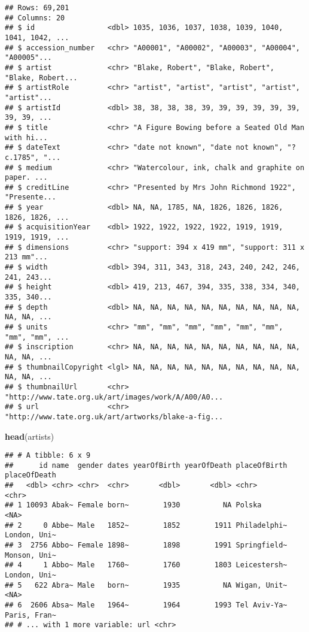 \documentclass[]{article}
\newenvironment{Shaded}{\begin{snugshade}}{\end{snugshade}}
\newcommand{\KeywordTok}[1]{\textcolor[rgb]{0.13,0.29,0.53}{\textbf{#1}}}
\newcommand{\NormalTok}[1]{#1}
\begin{document}
\begin{verbatim}
## Rows: 69,201
## Columns: 20
## $ id                 <dbl> 1035, 1036, 1037, 1038, 1039, 1040, 1041, 1042, ...
## $ accession_number   <chr> "A00001", "A00002", "A00003", "A00004", "A00005"...
## $ artist             <chr> "Blake, Robert", "Blake, Robert", "Blake, Robert...
## $ artistRole         <chr> "artist", "artist", "artist", "artist", "artist"...
## $ artistId           <dbl> 38, 38, 38, 38, 39, 39, 39, 39, 39, 39, 39, 39, ...
## $ title              <chr> "A Figure Bowing before a Seated Old Man with hi...
## $ dateText           <chr> "date not known", "date not known", "?c.1785", "...
## $ medium             <chr> "Watercolour, ink, chalk and graphite on paper. ...
## $ creditLine         <chr> "Presented by Mrs John Richmond 1922", "Presente...
## $ year               <dbl> NA, NA, 1785, NA, 1826, 1826, 1826, 1826, 1826, ...
## $ acquisitionYear    <dbl> 1922, 1922, 1922, 1922, 1919, 1919, 1919, 1919, ...
## $ dimensions         <chr> "support: 394 x 419 mm", "support: 311 x 213 mm"...
## $ width              <dbl> 394, 311, 343, 318, 243, 240, 242, 246, 241, 243...
## $ height             <dbl> 419, 213, 467, 394, 335, 338, 334, 340, 335, 340...
## $ depth              <dbl> NA, NA, NA, NA, NA, NA, NA, NA, NA, NA, NA, NA, ...
## $ units              <chr> "mm", "mm", "mm", "mm", "mm", "mm", "mm", "mm", ...
## $ inscription        <chr> NA, NA, NA, NA, NA, NA, NA, NA, NA, NA, NA, NA, ...
## $ thumbnailCopyright <lgl> NA, NA, NA, NA, NA, NA, NA, NA, NA, NA, NA, NA, ...
## $ thumbnailUrl       <chr> "http://www.tate.org.uk/art/images/work/A/A00/A0...
## $ url                <chr> "http://www.tate.org.uk/art/artworks/blake-a-fig...
\end{verbatim}

\begin{Shaded}
\begin{Highlighting}[]
\KeywordTok{head}\NormalTok{(artists)}
\end{Highlighting}
\end{Shaded}

\begin{verbatim}
## # A tibble: 6 x 9
##      id name  gender dates yearOfBirth yearOfDeath placeOfBirth placeOfDeath
##   <dbl> <chr> <chr>  <chr>       <dbl>       <dbl> <chr>        <chr>       
## 1 10093 Abak~ Female born~        1930          NA Polska       <NA>        
## 2     0 Abbe~ Male   1852~        1852        1911 Philadelphi~ London, Uni~
## 3  2756 Abbo~ Female 1898~        1898        1991 Springfield~ Monson, Uni~
## 4     1 Abbo~ Male   1760~        1760        1803 Leicestersh~ London, Uni~
## 5   622 Abra~ Male   born~        1935          NA Wigan, Unit~ <NA>        
## 6  2606 Absa~ Male   1964~        1964        1993 Tel Aviv-Ya~ Paris, Fran~
## # ... with 1 more variable: url <chr>
\end{verbatim}
\end{document}
